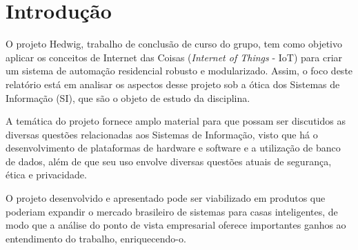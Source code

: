 \chapter{Introdução}

O projeto Hedwig, trabalho de conclusão de curso do grupo, tem como objetivo aplicar os conceitos de Internet das Coisas (\emph{Internet of Things} - IoT) para criar um sistema de automação residencial robusto e modularizado. Assim, o foco deste relatório está em analisar os aspectos desse projeto sob a ótica dos Sistemas de Informação (SI), que são o objeto de estudo da disciplina.

A temática do projeto fornece amplo material para que possam ser discutidos as diversas questões relacionadas aos Sistemas de Informação, visto que há o desenvolvimento de plataformas de hardware e software e a utilização de banco de dados, além de que seu uso envolve diversas questões atuais de segurança, ética e privacidade.

O projeto desenvolvido e apresentado pode ser viabilizado em produtos que poderiam expandir o mercado brasileiro de sistemas para casas inteligentes, de modo que a análise do ponto de vista empresarial oferece importantes ganhos ao entendimento do trabalho, enriquecendo-o.

